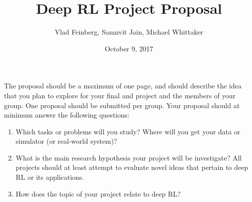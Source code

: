 \documentclass{report}
\title{Deep RL Project Proposal}
\author{Vlad Feinberg, Samnvit Jain, Michael Whittaker}
\date{October 9, 2017}
\begin{document}
\maketitle{}

The proposal should be a maximum of one page, and should describe the idea that
you plan to explore for your final and project and the members of your group.
One proposal should be submitted per group. Your proposal should at minimum
answer the following questions:
\begin{enumerate}
  \item
    Which tasks or problems will you study? Where will you get your data or
    simulator (or real-world system)?
  \item
    What is the main research hypothesis your project will be investigate? All
    projects should at least attempt to evaluate novel ideas that pertain to
    deep RL or its applications.
  \item
    How does the topic of your project relate to deep RL?
\end{enumerate}

\cite{munk2016learning}
\cite{watter2015embed}
\cite{shelhamer2016loss}
\cite{venkatraman2017predictive}



\end{document}
